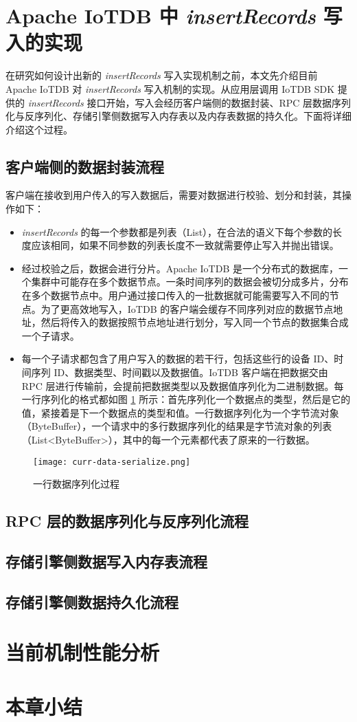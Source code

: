 \section{Apache IoTDB 中 \emph{insertRecords} 写入的实现}
在研究如何设计出新的 \emph{insertRecords} 写入实现机制之前，本文先介绍目前 Apache IoTDB 对 \emph{insertRecords} 写入机制的实现。从应用层调用 IoTDB SDK 提供的 \emph{insertRecords} 接口开始，写入会经历客户端侧的数据封装、RPC 层数据序列化与反序列化、存储引擎侧数据写入内存表以及内存表数据的持久化。下面将详细介绍这个过程。
\subsection{客户端侧的数据封装流程}
客户端在接收到用户传入的写入数据后，需要对数据进行校验、划分和封装，其操作如下：
\begin{itemize}
  \item \emph{insertRecords} 的每一个参数都是列表（List），在合法的语义下每个参数的长度应该相同，如果不同参数的列表长度不一致就需要停止写入并抛出错误。
  \item 经过校验之后，数据会进行分片。Apache IoTDB 是一个分布式的数据库，一个集群中可能存在多个数据节点。一条时间序列的数据会被切分成多片，分布在多个数据节点中\cite{wang2023apache}。用户通过接口传入的一批数据就可能需要写入不同的节点。为了更高效地写入，IoTDB 的客户端会缓存不同序列对应的数据节点地址，然后将传入的数据按照节点地址进行划分，写入同一个节点的数据集合成一个子请求。
  \item 每一个子请求都包含了用户写入的数据的若干行，包括这些行的设备 ID、时间序列 ID、数据类型、时间戳以及数据值。IoTDB 客户端在把数据交由 RPC 层进行传输前，会提前把数据类型以及数据值序列化为二进制数据。每一行序列化的格式都如图 \ref{fig:curr-line-serialize-format} 所示：首先序列化一个数据点的类型，然后是它的值，紧接着是下一个数据点的类型和值。一行数据序列化为一个字节流对象（ByteBuffer），一个请求中的多行数据序列化的结果是字节流对象的列表（List<ByteBuffer>），其中的每一个元素都代表了原来的一行数据。
\end{itemize}

\begin{figure}
  \centering
  \texttt{[image: curr-data-serialize.png]}
  \caption{一行数据序列化过程}
  \label{fig:curr-line-serialize-format}
\end{figure}

\subsection{RPC 层的数据序列化与反序列化流程}
\subsection{存储引擎侧数据写入内存表流程}
\subsection{存储引擎侧数据持久化流程}
\section{当前机制性能分析}
\section{本章小结}